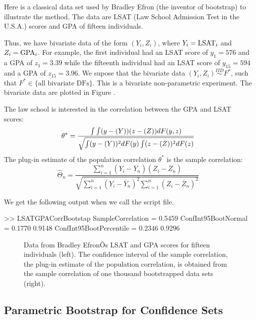 \begin{labwork}\label{LW:LSATGPACorrBoot}
Here is a classical data set used by Bradley Efron (the inventor of bootstrap) to illustrate the method.  The data are LSAT (Law School Admission Test in the U.S.A.) scores and GPA of fifteen individuals.

Thus, we have bivariate data of the form $(Y_i,Z_i)$, where $Y_i={\rm LSAT}_i$ and $Z_i={\rm GPA}_i$.  For example, the first individual had an LSAT score of  $y_1=576$ and a GPA of $z_1=3.39$ while the fifteenth individual had an LSAT score of $y_{15}=594$ and a GPA of $z_{15}=3.96$.  We supose that the bivariate data $(Y_i,Z_i) \overset{IID}{\sim} F^*$, such that $F^* \in \{ \text{all bivariate DFs} \}$.  This is a bivariate non-parametric experiment.  The bivariate data are plotted in Figure .


The law school is interested in the correlation between the GPA and LSAT scores:
$$
\theta^* = \frac{\int \int (y-\mathscr{(}Y))(z-\mathscr{(}Z))dF(y,z)}{\sqrt{\int (y-\mathscr{(}Y))^2 dF(y) \int (z-\mathscr{(}Z))^2 dF(z)}}
$$
The plug-in estimate of the population correlation $\theta^*$ is the sample correlation:
$$
\widehat{\Theta}_n = \frac{\sum_{i=1}^n(Y_i-\overline{Y}_n)(Z_i-\overline{Z}_n)}{\sqrt{\sum_{i=1}^n(Y_i-\overline{Y}_n)^2 \sum_{i=1}^n(Z_i-\overline{Z}_n)^2}}
$$ 

We get the following output when we call the script file.
\begin{VrbM}
>> LSATGPACorrBootstap
SampleCorrelation =    0.5459
ConfInt95BootNormal =    0.1770    0.9148
ConfInt95BootPercentile =    0.2346    0.9296
\end{VrbM}

\begin{figure}
\caption{Data from Bradley EfronÕs LSAT and GPA scores for fifteen individuals (left).  The confidence interval of the sample correlation, the plug-in estimate of the population correlation, is obtained from the sample correlation of one thousand bootstrapped data sets (right).\label{F:LSATGPACorrBootstrap}}
\begin{center}
\end{center}
\end{figure}

\end{labwork}

\subsection{Parametric Bootstrap for Confidence Sets}\label{S:PBootstrap}

